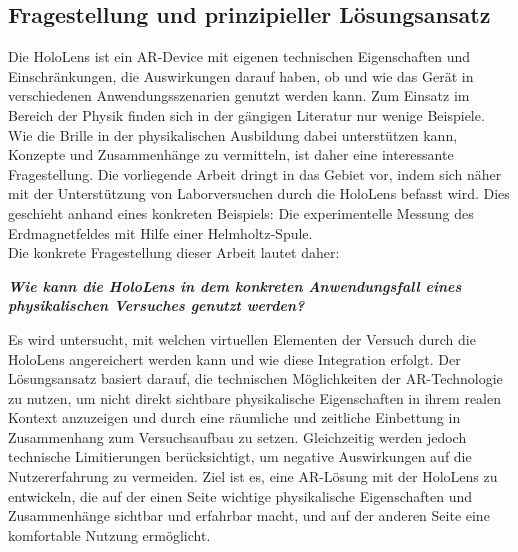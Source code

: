 \subsection{Fragestellung und prinzipieller Lösungsansatz}
\label{sec-1-2}
Die HoloLens ist ein AR-Device mit eigenen technischen Eigenschaften und Einschränkungen, die Auswirkungen darauf haben, ob und wie das Gerät in verschiedenen Anwendungsszenarien genutzt werden kann. Zum Einsatz im Bereich der Physik finden sich in der gängigen Literatur nur wenige Beispiele. Wie die Brille in der physikalischen Ausbildung dabei unterstützen kann, Konzepte und Zusammenhänge zu vermitteln, ist daher eine interessante Fragestellung. Die vorliegende Arbeit dringt in das Gebiet vor, indem sich näher mit der Unterstützung von Laborversuchen durch die HoloLens befasst wird. Dies geschieht anhand eines konkreten Beispiels: Die experimentelle Messung des Erdmagnetfeldes mit Hilfe einer Helmholtz-Spule.\\

Die konkrete Fragestellung dieser Arbeit lautet daher:
\begin{center}
	\textit{\textbf{Wie kann die HoloLens in dem konkreten Anwendungsfall eines physikalischen Versuches genutzt werden?}}
\end{center}

Es wird untersucht, mit welchen virtuellen Elementen der Versuch durch die HoloLens angereichert werden kann und wie diese Integration erfolgt. Der Lösungsansatz basiert darauf, die technischen Möglichkeiten der AR-Technologie zu nutzen, um nicht direkt sichtbare physikalische Eigenschaften in ihrem realen Kontext anzuzeigen und durch eine räumliche und zeitliche Einbettung in Zusammenhang zum Versuchsaufbau zu setzen. Gleichzeitig werden jedoch technische Limitierungen berücksichtigt, um negative Auswirkungen auf die Nutzererfahrung zu vermeiden. Ziel ist es, eine AR-Lösung mit der HoloLens zu entwickeln, die auf der einen Seite wichtige physikalische Eigenschaften und Zusammenhänge sichtbar und erfahrbar macht, und auf der anderen Seite eine komfortable Nutzung ermöglicht.

